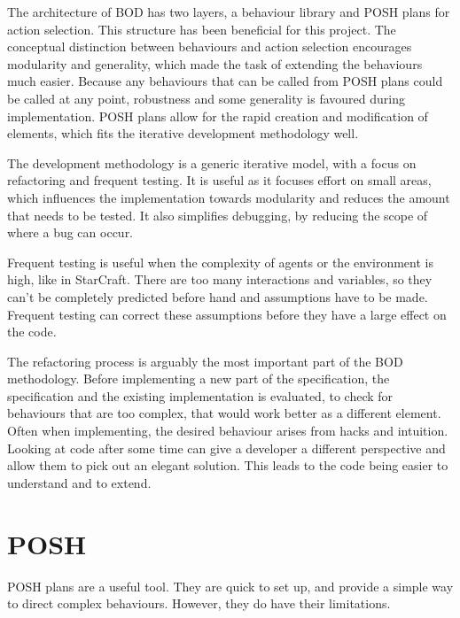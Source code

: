 \documentclass[11pt,openright,a4paper]{report}
\begin{document}
The architecture of BOD has two layers, a behaviour library and POSH plans for action selection. This structure has been beneficial for this project. The conceptual distinction between behaviours and action selection encourages modularity and generality, which made the task of extending the behaviours much easier. Because any behaviours that can be called from POSH plans could be called at any point, robustness and some generality is favoured during implementation.  POSH plans allow for the rapid creation and modification of elements, which fits the iterative development methodology well.

The development methodology is a generic iterative model, with a focus on refactoring and frequent testing. It is useful as it focuses effort on small areas, which influences the implementation towards modularity and reduces the amount that needs to be tested. It also simplifies debugging, by reducing the scope of where a bug can occur.

Frequent testing is useful when the complexity of agents or the environment is high, like in StarCraft. There are too many interactions and variables, so they can't be completely predicted before hand and assumptions have to be made. Frequent testing can correct these assumptions before they have a large effect on the code.

The refactoring process is arguably the most important part of the BOD methodology. Before implementing a new part of the specification, the specification and the existing implementation is evaluated, to check for behaviours that are too complex, that would work better as a different element. Often when implementing, the desired behaviour arises from hacks and intuition. Looking at code after some time can give a developer a different perspective and allow them to pick out an elegant solution. This leads to the code being easier to understand and to extend.

\section{POSH}

POSH plans are a useful tool. They are quick to set up, and provide a simple way to direct complex behaviours. However, they do have their limitations.
\end{document}
